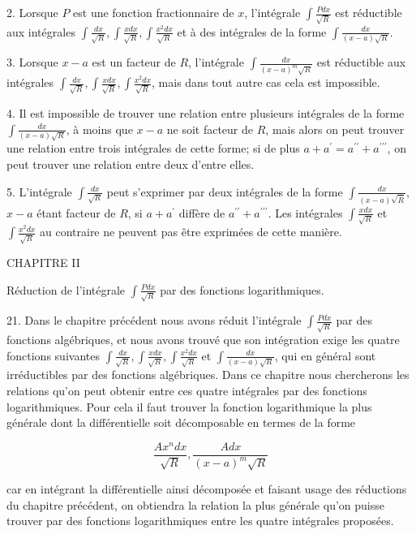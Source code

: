 \documentclass{article}
\begin{document}
2. Lorsque \(P\) est une fonction fractionnaire de \(x\), l'intégrale \(\int \frac{P d x}{\sqrt{R}}\) est réductible aux intégrales \(\int \frac{d x}{\sqrt{R}}, \int \frac{x d x}{\sqrt{R}}, \int \frac{x^{2} d x}{\sqrt{R}}\) et à des intégrales de la forme \(\int \frac{d x}{(x-a) \sqrt{R}}\).

3. Lorsque \(x-a\) est un facteur de \(R\), l'intégrale \(\int \frac{d x}{(x-a)^{m} \sqrt{R}}\) est réductible aux intégrales \(\int \frac{d x}{\sqrt{R}}, \int \frac{x d x}{\sqrt{R}}, \int \frac{x^{2} d x}{\sqrt{R}}\), mais dans tout autre cas cela est impossible.

4. Il est impossible de trouver une relation entre plusieurs intégrales de la forme \(\int \frac{d x}{(x-a) \sqrt{R}}\), à moins que \(x-a\) ne soit facteur de \(R\), mais alors on peut trouver une relation entre trois intégrales de cette forme; si de plus \(a+a^{\prime}=a^{\prime \prime}+a^{\prime \prime \prime}\), on peut trouver une relation entre deux d'entre elles.

5. L'intégrale \(\int \frac{d x}{\sqrt{R}}\) peut s'exprimer par deux intégrales de la forme \(\int \frac{d x}{(x-a) \sqrt{\bar{R}}}\), \(x-a\) étant facteur de \(R\), si \(a+a^{\prime}\) diffère de \(a^{\prime \prime}+a^{\prime \prime \prime}\). Les intégrales \(\int \frac{x d x}{\sqrt{R}}\) et \(\int \frac{x^{2} d x}{\sqrt{R}}\) au contraire ne peuvent pas être exprimées de cette manière.

CHAPITRE II

Réduction de l'intégrale \(\int \frac{P d x}{\sqrt{R}}\) par des fonctions logarithmiques.

21. Dans le chapitre précédent nous avons réduit l'intégrale \(\int \frac{P d x}{\sqrt{R}}\) par des fonctions algébriques, et nous avons trouvé que son intégration exige les
quatre fonctions suivantes \(\int \frac{d x}{\sqrt{R}}, \int \frac{x d x}{\sqrt{R}}, \int \frac{x^{2} d x}{\sqrt{R}}\) et \(\int \frac{d x}{(x-a) \sqrt{R}}\), qui en général sont irréductibles par des fonctions algébriques. Dans ce chapitre nous chercherons les relations qu'on peut obtenir entre ces quatre intégrales par des fonctions logarithmiques. Pour cela il faut trouver la fonction logarithmique la plus générale dont la différentielle soit décomposable en termes de la forme

\[
\frac{A x^{n} d x}{\sqrt{R}}, \frac{A d x}{(x-a)^{m} \sqrt{R}}
\]

car en intégrant la différentielle ainsi décomposée et faisant usage des réductions du chapitre précédent, on obtiendra la relation la plus générale qu'on puisse trouver par des fonctions logarithmiques entre les quatre intégrales proposées.
\end{document}

